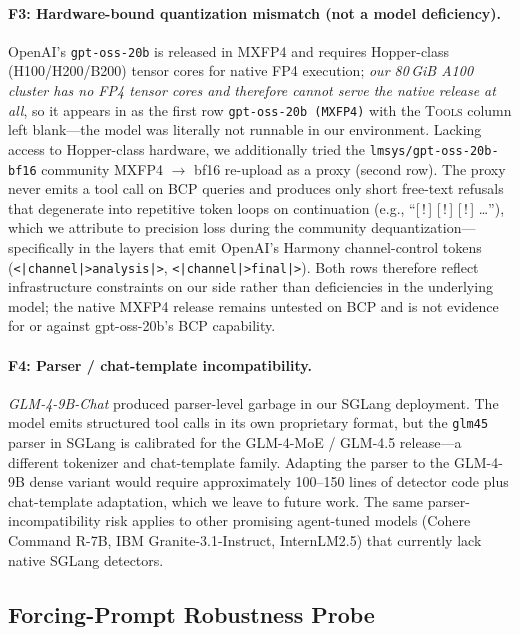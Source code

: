 \documentclass[11pt]{article}
\begin{document}
\paragraph{F3: Hardware-bound quantization mismatch (not a model
deficiency).}
OpenAI's \texttt{gpt-oss-20b} is released in MXFP4 and requires
Hopper-class (H100/H200/B200) tensor cores for native FP4 execution;
\emph{our 80\,GiB A100 cluster has no FP4 tensor cores and therefore
cannot serve the native release at all}, so it appears in
 as the first row \texttt{gpt-oss-20b
(MXFP4)} with the \textsc{Tools} column left blank---the model was
literally not runnable in our environment. Lacking access to
Hopper-class hardware, we additionally tried the
\texttt{lmsys/gpt-oss-20b-bf16} community MXFP4 $\rightarrow$ bf16
re-upload as a proxy (second row). The proxy never emits a tool call
on BCP queries and produces only short free-text refusals that
degenerate into repetitive token loops on continuation (e.g.,
``[\,!\,] [\,!\,] [\,!\,] \ldots''), which we attribute to precision
loss during the community dequantization---specifically in the layers
that emit OpenAI's Harmony channel-control tokens
(\texttt{<|channel|>analysis|>}, \texttt{<|channel|>final|>}). Both
rows therefore reflect infrastructure constraints on our side rather
than deficiencies in the underlying model; the native MXFP4 release
remains untested on BCP and is not evidence for or against
gpt-oss-20b's BCP capability.

\paragraph{F4: Parser / chat-template incompatibility.}
\textit{GLM-4-9B-Chat} produced parser-level garbage in our SGLang
deployment. The model emits structured tool calls in its own
proprietary format, but the \texttt{glm45} parser in SGLang is
calibrated for the GLM-4-MoE / GLM-4.5 release---a different
tokenizer and chat-template family. Adapting the parser to the
GLM-4-9B dense variant would require approximately 100--150 lines of
detector code plus chat-template adaptation, which we leave to future
work. The same parser-incompatibility risk applies to other promising
agent-tuned models (Cohere Command R-7B, IBM Granite-3.1-Instruct,
InternLM2.5) that currently lack native SGLang detectors.

\subsection{Forcing-Prompt Robustness Probe}
\label{appendix:cross-arch-forcing}
\end{document}
